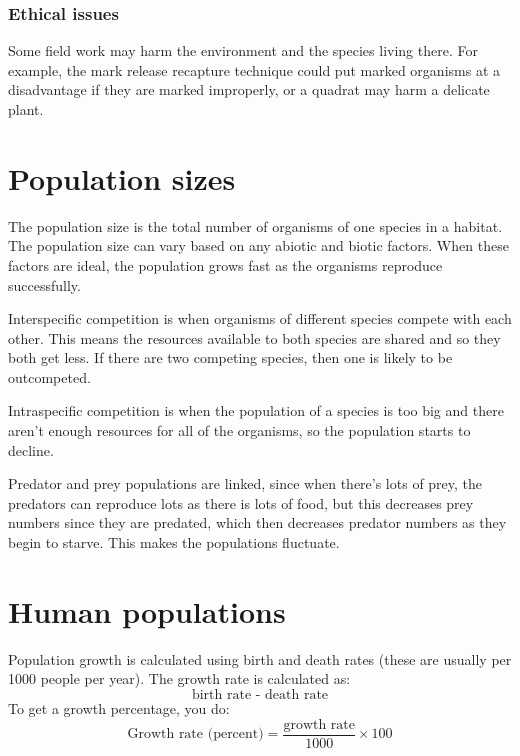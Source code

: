 \documentclass{article}
\begin{document}
\subsubsection*{Ethical issues}
Some field work may harm the environment and the species living there. For
example, the mark release recapture technique could put marked organisms at a
disadvantage if they are marked improperly, or a quadrat may harm a delicate
plant.

\section*{Population sizes}
The population size is the total number of organisms of one species in a
habitat. The population size can vary based on any abiotic and biotic factors.
When these factors are ideal, the population grows fast as the organisms
reproduce successfully.

Interspecific competition is when organisms of different species compete with
each other. This means the resources available to both species are shared and
so they both get less. If there are two competing species, then one is likely
to be outcompeted.

Intraspecific competition is when the population of a species is too big and
there aren't enough resources for all of the organisms, so the population starts
to decline.

Predator and prey populations are linked, since when there's lots of prey, the
predators can reproduce lots as there is lots of food, but this decreases prey
numbers since they are predated, which then decreases predator numbers as they
begin to starve. This makes the populations fluctuate.

\section*{Human populations}
Population growth is calculated using birth and death rates (these are usually
per 1000 people per year). The growth rate is calculated as:
\[
		\textrm{birth rate - death rate}
\]
To get a growth percentage, you do:
\[
	\textrm{Growth rate (percent)} = \frac{\textrm{growth rate}}{1000} \times
	100
\]
\end{document}
